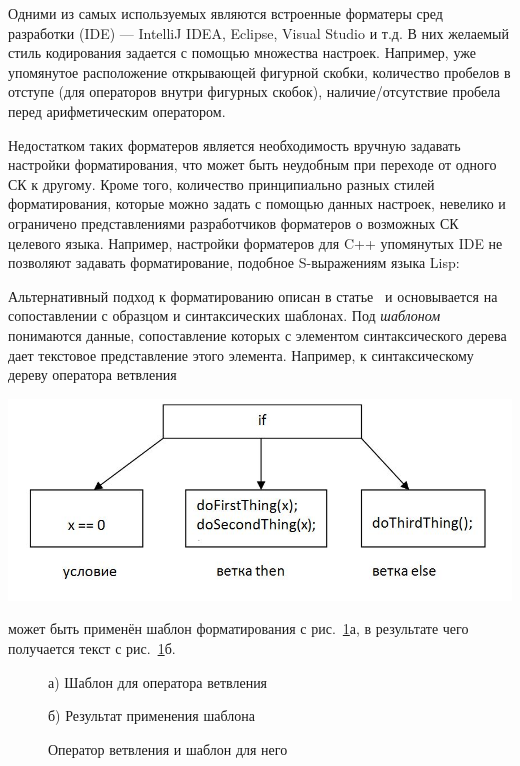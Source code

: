 \documentclass[conference]{IEEEtran}
\begin{document}
Одними из самых используемых являются встроенные форматеры
сред разработки (IDE) --- IntelliJ IDEA, Eclipse, Visual Studio и т.д.
В них желаемый стиль кодирования задается с помощью множества настроек.
Например, уже упомянутое расположение открывающей фигурной скобки,
количество пробелов в отступе (для операторов внутри фигурных скобок),
наличие/отсутствие пробела перед арифметическим оператором.

Недостатком таких форматеров является необходимость вручную задавать
настройки форматирования, что может быть неудобным при переходе
от одного СК к другому.
Кроме того, количество принципиально разных стилей форматирования,
которые можно задать с помощью данных настроек, невелико и ограничено
представлениями разработчиков форматеров о возможных СК целевого языка.
Например, настройки форматеров для C++ упомянутых IDE не позволяют задавать
форматирование, подобное S-выражениям языка Lisp:



Альтернативный подход к форматированию описан в статье~\cite{while}
и основывается на сопоставлении с образцом и синтаксических шаблонах.
Под \emph{шаблоном} понимаются данные, сопоставление которых с элементом синтаксического дерева дает текстовое представление этого элемента.
Например, к синтаксическому дереву оператора ветвления
\vspace{.3cm}

{
\centering
\includegraphics[width=.5\textwidth]{images/ifTree.jpg}
}

\vspace{-.5cm}
\noindent
может быть применён шаблон форматирования с рис.~\ref{fig:tmpltcodeintro}а,
в результате чего получается текст с рис.~\ref{fig:tmpltcodeintro}б.

\begin{figure}[ht]
\noindent\begin{minipage}{.2\textwidth}
    
\caption*{а) Шаблон для оператора ветвления}    
\end{minipage}\hfill
\begin{minipage}{.25\textwidth}
    
\caption*{б) Результат применения шаблона}    
\end{minipage}
\caption{Оператор ветвления и шаблон для него}    
\label{fig:tmpltcodeintro}
\end{figure}
\end{document}
